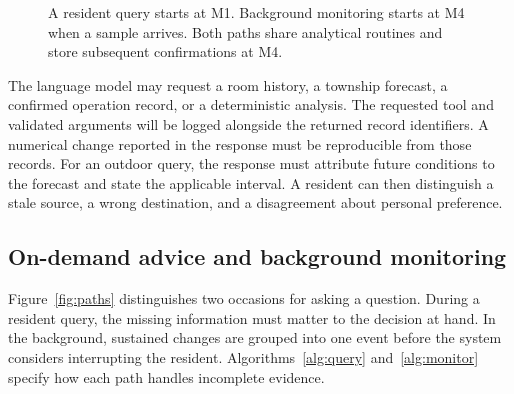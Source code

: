 \documentclass[conference]{IEEEtran}
\begin{document}
\begin{figure}[t]
\centering
{}
\caption{A resident query starts at M1. Background monitoring starts at M4 when a sample arrives. Both paths share analytical routines and store subsequent confirmations at M4.}
\label{fig:arch}
\end{figure}

The language model may request a room history, a township forecast, a confirmed operation record, or a deterministic analysis. The requested tool and validated arguments will be logged alongside the returned record identifiers. A numerical change reported in the response must be reproducible from those records. For an outdoor query, the response must attribute future conditions to the forecast and state the applicable interval. A resident can then distinguish a stale source, a wrong destination, and a disagreement about personal preference.

\subsection{On-demand advice and background monitoring}
Figure~\ref{fig:paths} distinguishes two occasions for asking a question. During a resident query, the missing information must matter to the decision at hand. In the background, sustained changes are grouped into one event before the system considers interrupting the resident. Algorithms~\ref{alg:query} and~\ref{alg:monitor} specify how each path handles incomplete evidence.
\end{document}
